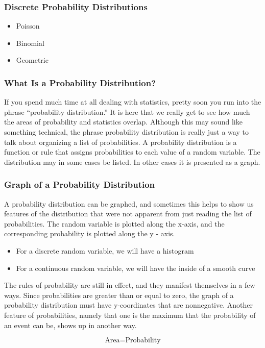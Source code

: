\documentclass[IntroMain.tex]{subfiles}
\begin{document}
\begin{frame}	
\frametitle{Discrete Probability Distributions}

\begin{itemize}
\item Poisson
\item Binomial
\item Geometric
\end{itemize}
\end{frame}
\begin{frame}
\frametitle{What Is a Probability Distribution?}
If you spend much time at all dealing with statistics, pretty soon you run into the phrase “probability distribution.” It is here that we really get to see how much the areas of probability and statistics overlap. Although this may sound like something technical, the phrase probability distribution is really just a way to talk about organizing a list of probabilities. A probability distribution is a function or rule that assigns probabilities to each value of a random variable. The distribution may in some cases be listed. In other cases it is presented as a graph.
\end{frame}
\begin{frame}
	\frametitle{Graph of a Probability Distribution}

A probability distribution can be graphed, and sometimes this helps to show us features of the distribution that were not apparent from just reading the list of probabilities. The random variable is plotted along the x-axis, and the corresponding probability is plotted along the y - axis.

\begin{itemize}
\item For a discrete random variable, we will have a histogram
\item For a continuous random variable, we will have the inside of a smooth curve
\end{itemize}

The rules of probability are still in effect, and they manifest themselves in a few ways. Since probabilities are greater than or equal to zero, the graph of a probability distribution must have y-coordinates that are nonnegative. Another feature of probabilities, namely that one is the maximum that the probability of an event can be, shows up in another way.

\[ \mbox{Area} = \mbox{Probability} \]

\end{frame}
\end{document}
